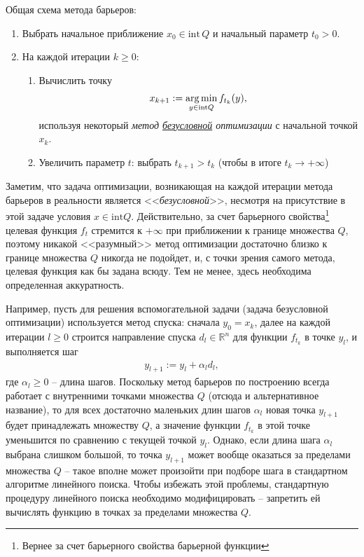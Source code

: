 \documentclass[%
	11pt,
	a4paper,
	utf8,
		]{article}
\begin{document}
{\color{blue}Общая схема метода барьеров}:
\begin{enumerate}
	\item Выбрать начальное приближение $ x_0 \in \text{int} \, Q $ и начальный параметр $ t_0 > 0 $.
	
	\item На каждой итерации $ k \geqslant 0 $:
	\begin{enumerate}
		\item Вычислить точку 
\begin{align*}
x_{k+1} := \operatorname*{arg\,min}_{ y \in \text{int} Q } f_{t_k} (y),
\end{align*}
    используя некоторый \emph{метод \underline{безусловной} оптимизации} с начальной точкой $ x_k $.
    
    \item Увеличить параметр $ t $: выбрать $ t_{k+1} > t_k $ (чтобы в итоге $ t_k \rightarrow + \infty $)
	\end{enumerate}
\end{enumerate}

Заметим, что задача оптимизации, возникающая на каждой итерации метода барьеров в реальности является <<\emph{безусловной}>>, несмотря на присутствие в этой задаче условия $ x \in \text{int} Q $. Действительно, за счет барьерного свойства\footnote{Вернее за счет барьерного свойства барьерной функции} целевая функция $ f_t $ стремится к $ + \infty $ при приближении к границе множества $ Q $, поэтому никакой <<разумный>> метод оптимизации достаточно близко к границе множества $ Q $ никогда не подойдет, и, с точки зрения самого метода, целевая функция как бы задана всюду. Тем не менее, здесь необходима определенная аккуратность.

Например, пусть для решения вспомогательной задачи (задача безусловной оптимизации) используется метод спуска: сначала $ y_0 = x_k $, далее на каждой итерации $ l \geqslant 0 $ строится направление спуска $ d_l \in \mathbb{R}^n $ для функции $ f_{t_k} $ в точке $ y_l $, и выполняется шаг
\begin{align*}
	y_{l + 1} := y_l + \alpha_l d_l,
\end{align*}
где $ \alpha_l \geqslant 0 $ -- длина шагов. Поскольку метод барьеров по построению всегда работает с внутренними точками множества $ Q $ (отсюда и альтернативное название), то для всех достаточно маленьких длин шагов $ \alpha_l $ новая точка $ y_{l+1} $ будет принадлежать множеству $ Q $, а значение функции $ f_{t_k} $ в этой точке уменьшится по сравнению с текущей точкой $ y_l $. Однако, если длина шага $ \alpha_l $ выбрана слишком большой, то точка $ y_{l+1} $ может вообще оказаться за пределами множества $ Q $ -- такое вполне может произойти при подборе шага в стандартном алгоритме линейного поиска. Чтобы избежать этой проблемы, стандартную процедуру линейного поиска необходимо модифицировать -- запретить ей вычислять функцию в точках за пределами множества $ Q $.
\end{document}
